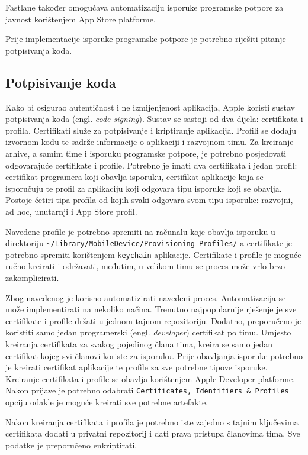 \documentclass[times, utf8, diplomski, numeric]{fer}
\newcommand{\eng}[1]{(engl. \textit{#1})}
\begin{document}
\begin{appendices}
Fastlane također omogućava automatizaciju isporuke programske potpore za javnost korištenjem App Store platforme.

Prije implementacije isporuke programske potpore je potrebno riješiti pitanje potpisivanja koda.

\subsection{Potpisivanje koda}

Kako bi osigurao autentičnost i ne izmijenjenost aplikacija, Apple koristi sustav potpisivanja koda \eng{code signing}. Sustav se sastoji od dva dijela: certifikata i profila. Certifikati služe za potpisivanje i kriptiranje aplikacija. Profili se dodaju izvornom kodu te sadrže informacije o aplikaciji i razvojnom timu. Za kreiranje arhive, a samim time i isporuku programske potpore, je potrebno posjedovati odgovarajuće certifikate i profile. Potrebno je imati dva certifikata i jedan profil: certifikat programera koji obavlja isporuku, certifikat aplikacije koja se isporučuju te profil za aplikaciju koji odgovara tipu isporuke koji se obavlja\citep{codesigning}. Postoje četiri tipa profila od kojih svaki odgovara svom tipu isporuke: razvojni, ad hoc, unutarnji i App Store profil.

Navedene profile je potrebno spremiti na računalu koje obavlja isporuku u direktoriju \verb|~/Library/MobileDevice/Provisioning Profiles/| a certifikate je potrebno spremiti korištenjem \verb|keychain| aplikacije. Certifikate i profile je moguće ručno kreirati i održavati, međutim, u velikom timu se proces može vrlo brzo zakomplicirati.

Zbog navedenog je korisno automatizirati navedeni proces. Automatizacija se može implementirati na nekoliko načina. Trenutno najpopularnije rješenje je sve certifikate i profile držati u jednom tajnom repozitoriju\citep{codesigningguide}. Dodatno, preporučeno je koristiti samo jedan programerski \eng{developer} certifikat po timu. Umjesto kreiranja certifikata za svakog pojedinog člana tima, kreira se samo jedan certifikat kojeg svi članovi koriste za isporuku. Prije obavljanja isporuke potrebno je kreirati certifikat aplikacije te profile za sve potrebne tipove isporuke. Kreiranje certifikata i profile se obavlja korištenjem Apple Developer platforme. Nakon prijave je potrebno odabrati \verb|Certificates, Identifiers & Profiles| opciju odakle je moguće kreirati sve potrebne artefakte.

Nakon kreiranja certifikata i profila je potrebno iste zajedno s tajnim ključevima certifikata dodati u privatni repozitorij i dati prava pristupa članovima tima. Sve podatke je preporučeno enkriptirati.


\end{appendices}
\end{document}

